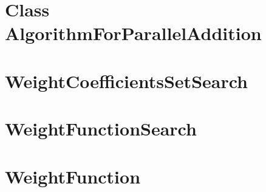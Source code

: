 \section{Class AlgorithmForParallelAddition}




\section{WeightCoefficientsSetSearch}



\section{WeightFunctionSearch}



\section{WeightFunction}


